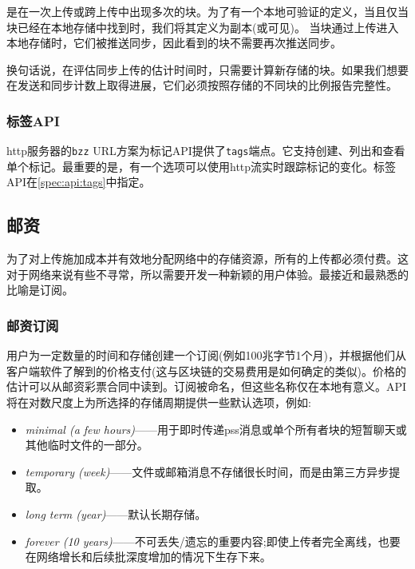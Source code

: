 是在一次上传或跨上传中出现多次的块。为了有一个本地可验证的定义，当且仅当块已经在本地存储中找到时，我们将其定义为副本(或可见)。
当块通过上传进入本地存储时，它们被推送同步，因此看到的块不需要再次推送同步。

换句话说，在评估同步上传的估计时间时，只需要计算新存储的块。如果我们想要在发送和同步计数上取得进展，它们必须按照存储的不同块的比例报告完整性。

\subsubsection{标签API} 

http服务器的\lstinline{bzz} URL方案为标记API提供了\lstinline{tags}端点。它支持创建、列出和查看单个标记。最重要的是，有一个选项可以使用http流实时跟踪标记的变化。标签API在\ref{spec:api:tags}中指定。



\subsection{邮资\statusgreen}\label{sec:postage-ux}

为了对上传施加成本并有效地分配网络中的存储资源，所有的上传都必须付费。这对于网络来说有些不寻常，所以需要开发一种新颖的用户体验。最接近和最熟悉的比喻是订阅。

\subsubsection{邮资订阅}

用户为一定数量的时间和存储创建一个订阅(例如100兆字节1个月)，并根据他们从客户端软件了解到的价格支付(这与区块链的交易费用是如何确定的类似)。价格的估计可以从邮资彩票合同中读到。订阅被命名，但这些名称仅在本地有意义。API将在对数尺度上为所选择的存储周期提供一些默认选项，例如: 

\begin{itemize}
\item \emph{minimal (a few hours)}——用于即时传递pss消息或单个所有者块的短暂聊天或其他临时文件的一部分。
\item \emph{temporary (week)}——文件或邮箱消息不存储很长时间，而是由第三方异步提取。
\item \emph{long term (year)}——默认长期存储。 
\item \emph{forever (10 years)}——不可丢失/遗忘的重要内容;即使上传者完全离线，也要在网络增长和后续批深度增加的情况下生存下来。
\end{itemize}

